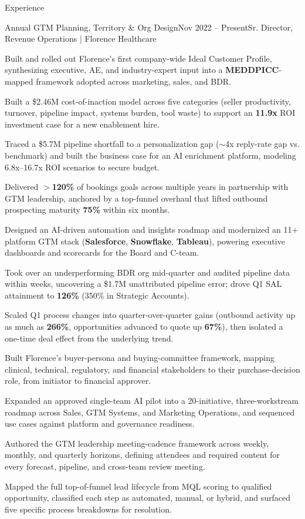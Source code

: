 \documentclass{resume}
\begin{document}
\begin{rSection}{Experience}
\begin{rSubsection}{Annual GTM Planning, Territory \& Org Design}{\textcolor{black!60}{Nov 2022 -- Present}}{Sr. Director, Revenue Operations $\vert$ Florence Healthcare}{}
\item Built and rolled out Florence's first company-wide Ideal Customer Profile, synthesizing executive, AE, and industry-expert input into a \textbf{MEDDPICC}-mapped framework adopted across marketing, sales, and BDR.
\item Built a \$2.46M cost-of-inaction model across five categories (seller productivity, turnover, pipeline impact, systems burden, tool waste) to support an \textbf{11.9x} ROI investment case for a new enablement hire.
\item Traced a \$5.7M pipeline shortfall to a personalization gap ($\sim$4x reply-rate gap vs. benchmark) and built the business case for an AI enrichment platform, modeling 6.8x--16.7x ROI scenarios to secure budget.
\item Delivered $>$\textbf{120\%} of bookings goals across multiple years in partnership with GTM leadership, anchored by a top-funnel overhaul that lifted outbound prospecting maturity \textbf{75\%} within six months.
\item Designed an AI-driven automation and insights roadmap and modernized an 11+ platform GTM stack (\textbf{Salesforce}, \textbf{Snowflake}, \textbf{Tableau}), powering executive dashboards and scorecards for the Board and C-team.
\item Took over an underperforming BDR org mid-quarter and audited pipeline data within weeks, uncovering a \$1.7M unattributed pipeline error; drove Q1 SAL attainment to \textbf{126\%} (350\% in Strategic Accounts).
\item Scaled Q1 process changes into quarter-over-quarter gains (outbound activity up as much as \textbf{266\%}, opportunities advanced to quote up \textbf{67\%}), then isolated a one-time deal effect from the underlying trend.
\item Built Florence's buyer-persona and buying-committee framework, mapping clinical, technical, regulatory, and financial stakeholders to their purchase-decision role, from initiator to financial approver.
\item Expanded an approved single-team AI pilot into a 20-initiative, three-workstream roadmap across Sales, GTM Systems, and Marketing Operations, and sequenced use cases against platform and governance readiness.
\item Authored the GTM leadership meeting-cadence framework across weekly, monthly, and quarterly horizons, defining attendees and required content for every forecast, pipeline, and cross-team review meeting.
\item Mapped the full top-of-funnel lead lifecycle from MQL scoring to qualified opportunity, classified each step as automated, manual, or hybrid, and surfaced five specific process breakdowns for resolution.

\end{rSubsection}
\end{rSection}
\end{document}
